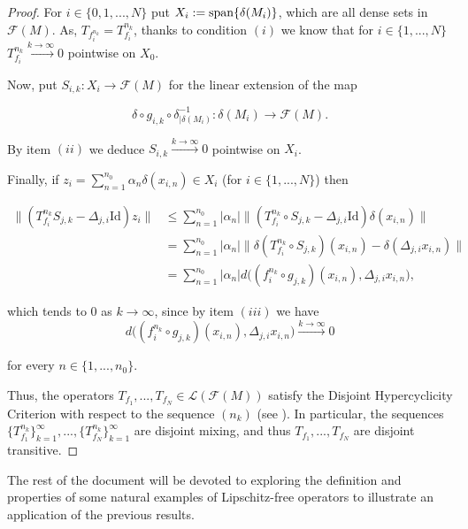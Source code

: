 \documentclass[11pt,reqno]{article}
\newcommand{\free}[1]{\mathcal{F}(#1)} %
\def\sp{\hbox{{\rm span}}}
\def\aa{\alpha}
\def\dd{\delta}
\begin{document}
\begin{proof}
For $i\in \{0,1,...,N\}$ put $X_i:= \sp\{\dd(M_i)\}$, which are all dense sets in $\free{M}$. As, $T_{f_i^{n_k}}= T_{f_i}^{n_k}$, thanks to condition $(i)$ we know that for $i\in \{1,...,N\}$ $T_{f_i}^{n_k} \xrightarrow{k\to \infty} 0$ pointwise on $X_0$.

Now, put $S_{i,k}:X_i\to \free{M}$ for the linear extension of the map 

\begin{equation*}
    \dd \circ g_{i,k}\circ \dd^{-1}_{|\dd(M_i)}: \dd(M_i) \to \free{M}.
\end{equation*}

By item $(ii)$ we deduce $S_{i,k}\xrightarrow{k\to \infty} 0$ pointwise on $X_i$.

Finally, if $z_i=\sum_{n=1}^{n_0} \aa_n \dd(x_{i,n}) \in X_i$ (for $i\in \{1,...,N\}$) then 

\begin{equation*}
\begin{split}
     \|( T_{f_i}^{n_k} S_{j,k} - \Delta_{j,i} \text{Id}) z_i \| & \leq \sum _{n=1}^{n_0} |\aa_n|\| ( T_{f_i}^{n_k} \circ S_{j,k} - \Delta_{j,i} \text{Id})\dd(x_{i,n})\| \\
     & = \sum _{n=1}^{n_0} |\aa_n|\| \dd( T_{f_i}^{n_k}\circ S_{j,k})(x_{i,n}) - \dd(\Delta_{j,i} x_{i,n})\| \\
     & = \sum _{n=1}^{n_0} |\aa_n| d\big((f_{i}^{n_k} \circ g_{j,k}) (x_{i,n}), \Delta_{j,i}x_{i,n}\big),
\end{split}
\end{equation*}

which tends to $0$ as $k\to \infty$, since by item $(iii)$ we have  
\[{d\big((f_{i}^{n_k} \circ g_{j,k}) (x_{i,n}), \Delta_{j,i}x_{i,n}\big)\xrightarrow{k\to \infty} 0}\]

for every $n\in \{1,...,n_0\}$.

Thus, the operators $T_{f_1},...,T_{f_N}\in \mathcal{L}(\free{M})$ satisfy the Disjoint Hypercyclicity Criterion with respect to the sequence $(n_k)$ (see \cite[Proposition 2.6]{BesPeris07}). In particular, the sequences $\{T_{f_1}^{n_k}\}_{k=1}^\infty,...,\{T_{f_N}^{n_k}\}_{k=1}^\infty$ are disjoint mixing, and thus $T_{f_1},...,T_{f_N}$ are disjoint transitive.
\end{proof}




The rest of the document will be devoted to exploring the definition and properties of some natural examples of Lipschitz-free operators to illustrate an application of the previous results.
\end{document}
